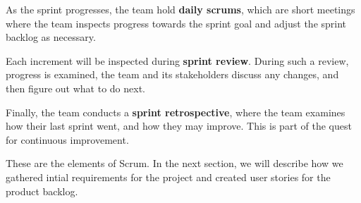 As the sprint progresses, the team hold \textbf{daily scrums}, which are short meetings where the team inspects progress towards the sprint goal and adjust the sprint backlog as necessary.

Each increment will be inspected during \textbf{sprint review}. During such a review, progress is examined, the team and its stakeholders discuss any changes, and then figure out what to do next.

Finally, the team conducts a \textbf{sprint retrospective}, where the team examines how their last sprint went, and how they may improve. This is part of the quest for continuous improvement.

These are the elements of Scrum. In the next section, we will describe how we gathered intial requirements for the project and created user stories for the product backlog.